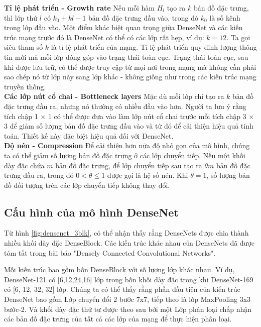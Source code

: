 {\bf Tỉ lệ phát triển - Growth rate}
Nếu mỗi hàm $H_l$ tạo ra $k$ bản đồ đặc trưng, thì lớp thứ $l$ có $k_0 + k{l-1}$ bản đồ đặc trưng đầu vào, trong đó $k_0$ là số kênh trong lớp đầu vào. Một điểm khác biệt quan trọng giữa DenseNet và các kiến trúc mạng trước đó là DenseNet có thể có các lớp rất hẹp, ví dụ: $k = 12$. Ta gọi siêu tham số $k$ là tỉ lệ phát triển của mạng. Tỉ lệ phát triển quy định lượng thông tin mới mà mỗi lớp đóng góp vào trạng thái toàn cục. Trạng thái toàn cục, sau khi được lưu trữ, có thể được truy cập từ mọi nơi trong mạng mà không cần phải sao chép nó từ lớp này sang lớp khác - không giống như trong các kiến trúc mạng truyền thống.\\
{\bf Các lớp nút cổ chai - Bottleneck layers}
Mặc dù mỗi lớp chỉ tạo ra $k$ bản đồ đặc trưng đầu ra, nhưng nó thường có nhiều đầu vào hơn. Người ta lưu ý rằng tích chập 1 × 1 có thể được đưa vào làm lớp nút cổ chai trước mỗi tích chập 3 × 3 để giảm số lượng bản đồ đặc trưng đầu vào và từ đó để cải thiện hiệu quả tính toán. Thiết kế này đặc biệt hiệu quả đối với DenseNet.\\
{\bf Độ nén - Compression}
Để cải thiện hơn nữa độ nhỏ gọn của mô hình, chúng ta có thể giảm số lượng bản đồ đặc trưng ở các lớp chuyển tiếp. Nếu một khối dày đặc chứa $m$ bản đồ đặc trưng, để lớp chuyển tiếp sau tạo ra $\theta m$ bản đồ đặc trưng đầu ra, trong đó $0 < \theta \leq 1$ được gọi là hệ số nén. Khi $\theta = 1$, số lượng bản đồ đối tượng trên các lớp chuyển tiếp không thay đổi.

\subsection{Cấu hình của mô hình DenseNet}
Từ hình \ref{fig:densenet_3blk}, có thể nhận thấy rằng DenseNets được chia thành nhiều khối dày đặc DenseBlock. Các kiến trúc khác nhau của DenseNets đã được tóm tắt trong bài báo "Densely Connected Convolutional Networks"\cite{densenet}. 

Mỗi kiến trúc bao gồm bốn DenseBlock với số lượng lớp khác nhau. Ví dụ, DenseNet-121 có [6,12,24,16] lớp trong bốn khối dày đặc trong khi DenseNet-169 có [6, 12, 32, 32] lớp. Chúng ta có thể thấy rằng phần đầu tiên của kiến trúc DenseNet bao gồm Lớp chuyển đổi 2 bước 7x7, tiếp theo là lớp MaxPooling 3x3 bước-2. Và khối dày đặc thứ tư được theo sau bởi một Lớp phân loại chấp nhận các bản đồ đặc trưng của tất cả các lớp của mạng để thực hiện phân loại. 

